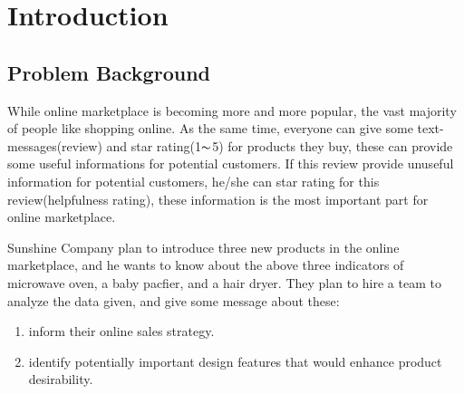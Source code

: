 \documentclass[../mcmpaper]{subfiles}
\begin{document}
	\section{Introduction}
	\subsection{Problem Background}
    While online marketplace is becoming more and more popular, the vast majority of people like shopping online. As the same time, everyone can give some text-messages(review) and star rating(1$\thicksim$5) for products they buy, these can provide some useful informations for potential customers. If this review provide unuseful information for potential customers, he/she can star rating for this review(helpfulness rating), these information is the most important part for online marketplace.
    \par
    Sunshine Company plan to introduce three new products in the online marketplace, and he wants to know about the above three indicators of microwave oven, a baby pacfier, and a hair dryer. They plan to hire a team to analyze the data given, and give some message about these:
    \begin{enumerate}[nosep, label=\textbullet]
        \item inform their online sales strategy.
        \item identify potentially important design features that would enhance product desirability. 
    \end{enumerate}
\end{document}
